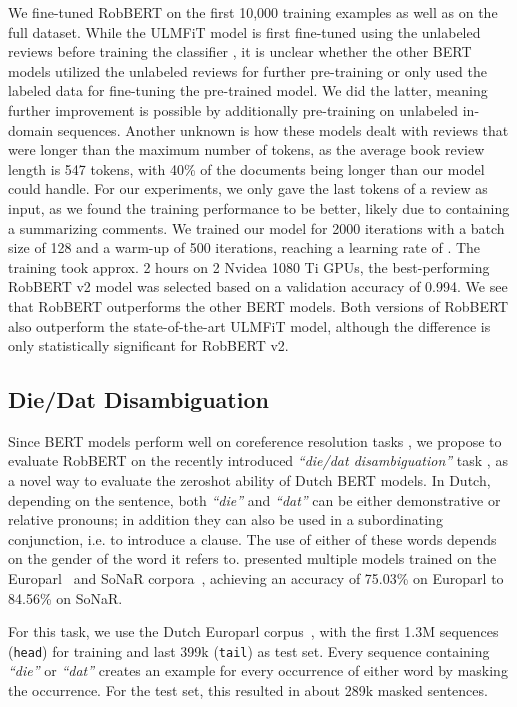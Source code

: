 \documentclass[11pt,a4paper]{article}
\begin{document}
We fine-tuned RobBERT on the first 10,000 training examples as well as on the full dataset.
While the ULMFiT model is first fine-tuned using the unlabeled reviews before training the classifier \citep{vanderburghMerits2019}, it is unclear whether the other BERT models utilized the unlabeled reviews for further pre-training \citep{sun2019classification} or only used the labeled data for fine-tuning the pre-trained model.
We did the latter, meaning further improvement is possible by additionally pre-training on unlabeled in-domain sequences.
Another unknown is how these models dealt with reviews that were longer than the maximum number of tokens, 
as the average book review length is 547 tokens, with 40\% of the documents being longer than our model could handle.
For our experiments, we only gave the last tokens of a review as input, as we found the training performance to be better,
likely due to containing a summarizing comments.
We trained our model for 2000 iterations with a batch size of 128 and a warm-up of 500 iterations, reaching a learning rate of . 
The training took approx. 2 hours on 2 Nvidea 1080 Ti GPUs, the best-performing RobBERT v2 model was selected based on a validation accuracy of 0.994. 
We see that RobBERT outperforms the other BERT models.
Both versions of RobBERT also outperform the state-of-the-art ULMFiT model, although the difference is only statistically significant for RobBERT v2.

\subsection{Die/Dat Disambiguation}\label{ss:die-dat}

Since BERT models perform well on coreference resolution tasks \citep{joshi2019coreference}, we propose to evaluate RobBERT on the recently introduced \emph{``die/dat disambiguation''} task \citep{alleinBinary2020}, as a novel way to evaluate the zeroshot ability of Dutch BERT models.
In Dutch, depending on the sentence, both \emph{``die''} and \emph{``dat''} can be either demonstrative or relative pronouns; in addition they can also be used in a subordinating conjunction, i.e. to introduce a clause.
The use of either of these words depends on the gender of the word it refers to.
\citet{alleinBinary2020} presented multiple models trained on the Europarl~\citep{koehnEuroparl2005a} and SoNaR corpora~\citep{oostdijkConstruction2013}, achieving an accuracy of 75.03\% on Europarl to 84.56\% on SoNaR.

For this task, we use the Dutch Europarl corpus~\citep{koehnEuroparl2005a}, with the first 1.3M sequences ({\tt head}) for training and last 399k ({\tt tail}) as test set. 
Every sequence containing \emph{``die''} or \emph{``dat''} creates an example for every occurrence of either word by masking the occurrence.
For the test set, this resulted in about 289k masked sentences.
\end{document}
